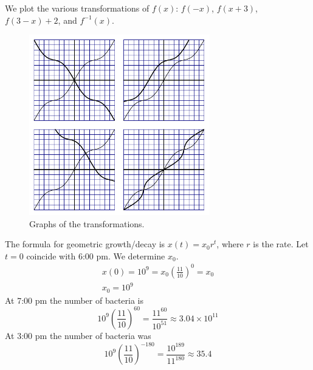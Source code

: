 {\begin{Solution}
\label{solution xsinx transform}
We plot the various transformations of $f(x)$:
$f(-x)$, $f(x+3)$, $f(3-x)+2$, and $f^{-1}(x)$.
\begin{figure}[tbp]
\begin{center}
\includegraphics[width=0.7\textwidth]{algebra/sets/xsinx_transform}
\end{center}
\caption{Graphs of the transformations.}
\label{figure xsinx transform}
\end{figure}
\end{Solution}






\begin{Solution}
\label{solution geometric growth bacteria}
The formula for geometric growth/decay is $x(t) = x_0 r^t$, where $r$ is 
the rate.  Let $t = 0$ coincide with 6:00 pm.  We determine $x_0$.
\begin{gather*}
  x(0) = 10^9 = x_0 \left( \frac{11}{10} \right)^0 = x_0
  \\
  x_0 = 10^9
\end{gather*}
At 7:00 pm the number of bacteria is
\[
\boxed{
  10^9 \left( \frac{11}{10} \right)^{60} = \frac{11^{60}}{10^{51}} \approx 3.04 \times 10^{11}
  }
\]
At 3:00 pm the number of bacteria was
\[
\boxed{
  10^9 \left( \frac{11}{10} \right)^{-180} = \frac{10^{189}}{11^{180}} \approx 35.4
  }
\]
\end{Solution}











}
